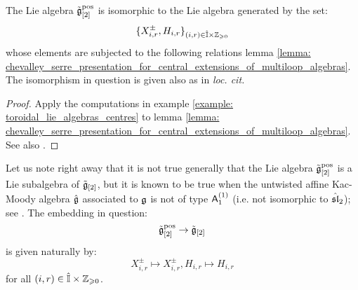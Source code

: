         \begin{corollary}
            The Lie algebra $\toroidal^{\positive}$ is isomorphic to the Lie algebra generated by the set:
                $$\{ X_{i, r}^{\pm}, H_{i, r} \}_{(i, r) \in \hat{\simpleroots} \x \Z_{\geq 0}}$$
            whose elements are subjected to the following relations lemma \ref{lemma: chevalley_serre_presentation_for_central_extensions_of_multiloop_algebras}. The isomorphism in question is given also as in \textit{loc. cit.}
        \end{corollary}
            \begin{proof}
                Apply the computations in example \ref{example: toroidal_lie_algebras_centres} to lemma \ref{lemma: chevalley_serre_presentation_for_central_extensions_of_multiloop_algebras}. See also \cite[Remark 4.5]{guay_nakajima_wendlandt_affine_yangian_vertex_representations_and_PBW}.
            \end{proof}
        \begin{remark}
            Let us note right away that it is not true generally that the Lie algebra $\toroidal^{\positive}$ is a Lie subalgebra of $\toroidal$, but it is known to be true when the untwisted affine Kac-Moody algebra $\hat{\g}$ associated to $\g$ is not of type $\sfA_1^{(1)}$ (i.e. not isomorphic to $\hat{\sl}_2$); see \cite[Corollary 4.6]{guay_nakajima_wendlandt_affine_yangian_vertex_representations_and_PBW}. The embedding in question:
                $$\toroidal^{\positive} \to \toroidal$$
            is given naturally by:
                $$X_{i, r}^{\pm} \mapsto X_{i, r}^{\pm}, H_{i, r} \mapsto H_{i, r}$$
            for all $(i, r) \in \hat{\simpleroots} \x \Z_{\geq 0}$.
        \end{remark}